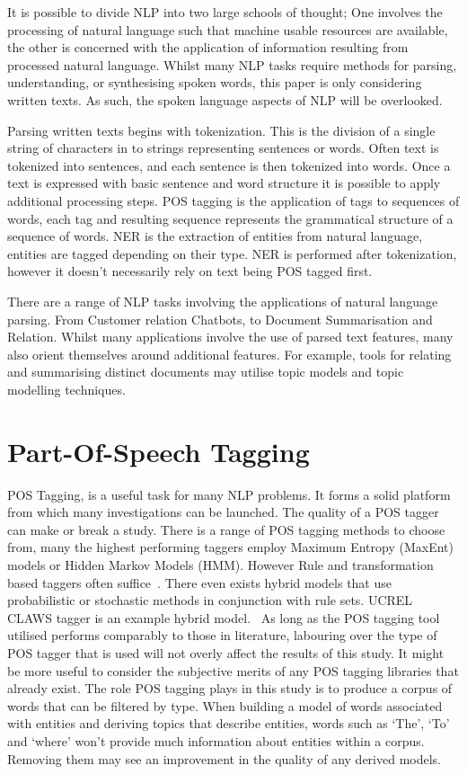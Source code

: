 \documentclass[10pt]{report}
\begin{document}
It is possible to divide NLP into two large schools of thought; One involves the processing of natural language such that machine usable resources are available, the other is concerned with the application of information resulting from processed natural language. Whilst many NLP tasks require methods for parsing, understanding, or synthesising spoken words, this paper is only considering written texts. As such, the spoken language aspects of NLP will be overlooked.

Parsing written texts begins with tokenization. This is the division of a single string of characters in to strings representing sentences or words. Often text is tokenized into sentences, and each sentence is then tokenized into words. Once a text is expressed with basic sentence and word structure it is possible to apply additional processing steps. POS tagging is the application of tags to sequences of words, each tag and resulting sequence represents the grammatical structure of a sequence of words. NER is the extraction of entities from natural language, entities are tagged depending on their type. NER is performed after tokenization, however it doesn’t necessarily rely on text being POS tagged first.

There are a range of NLP tasks involving the applications of natural language parsing. From Customer relation Chatbots, to Document Summarisation and Relation. Whilst many applications involve the use of parsed text features, many also orient themselves around additional features. For example, tools for relating and summarising distinct documents may utilise topic models and topic modelling techniques.


\section{Part-Of-Speech Tagging}
POS Tagging, is a useful task for many NLP problems. It forms a solid platform from which many investigations can be launched. The quality of a POS tagger can make or break a study. There is a range of POS tagging methods to choose from, many the highest performing taggers employ Maximum Entropy (MaxEnt) models or Hidden Markov Models (HMM). However Rule and transformation based taggers often suffice~\cite{Brill1995-sr,Brill1992-hh,Huang2009-xb,Cutting1992-vx}. There even exists hybrid models that use probabilistic or stochastic methods in conjunction with rule sets. UCREL CLAWS tagger is an example hybrid model.~\cite{Leech1994-rh}
As long as the POS tagging tool utilised performs comparably to those in literature, labouring over the type of POS tagger that is used will not overly affect the results of this study. It might be more useful to consider the subjective merits of any POS tagging libraries that already exist.
The role POS tagging plays in this study is to produce a corpus of words that can be filtered by type. When building a model of words associated with entities and deriving topics that describe entities, words such as ‘The’, ‘To’ and ‘where’ won’t provide much information about entities within a corpus. Removing them may see an improvement in the quality of any derived models.
\end{document}
